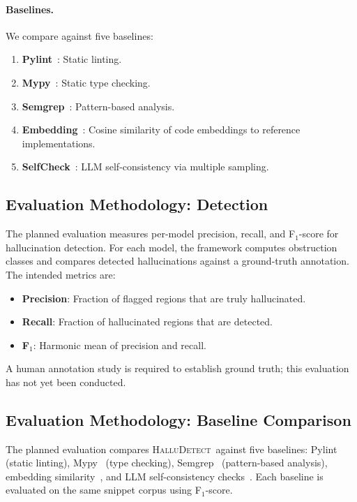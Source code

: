 \documentclass[11pt]{article}
\newcommand{\HalluDetect}{\textsc{HalluDetect}}
\begin{document}
\paragraph{Baselines.}
We compare against five baselines:
\begin{enumerate}[noitemsep]
  \item \textbf{Pylint}~\cite{Pylint}: Static linting.
  \item \textbf{Mypy}~\cite{Mypy}: Static type checking.
  \item \textbf{Semgrep}~\cite{Semgrep}: Pattern-based analysis.
  \item \textbf{Embedding}~\cite{Varshney2023}: Cosine similarity
        of code embeddings to reference implementations.
  \item \textbf{SelfCheck}~\cite{Manakul2023}: LLM self-consistency
        via multiple sampling.
\end{enumerate}

\subsection{Evaluation Methodology: Detection}

The planned evaluation measures per-model precision, recall, and
F$_1$-score for hallucination detection.  For each model, the
framework computes obstruction classes and compares detected
hallucinations against a ground-truth annotation.  The intended
metrics are:
\begin{itemize}[noitemsep]
  \item \textbf{Precision}: Fraction of flagged regions that are truly hallucinated.
  \item \textbf{Recall}: Fraction of hallucinated regions that are detected.
  \item \textbf{F$_1$}: Harmonic mean of precision and recall.
\end{itemize}
A human annotation study is required to establish ground truth;
this evaluation has not yet been conducted.


\subsection{Evaluation Methodology: Baseline Comparison}

The planned evaluation compares \HalluDetect\ against five baselines:
Pylint~\cite{Pylint} (static linting), Mypy~\cite{Mypy} (type checking),
Semgrep~\cite{Semgrep} (pattern-based analysis),
embedding similarity~\cite{Varshney2023}, and LLM self-consistency
checks~\cite{Manakul2023}.  Each baseline is evaluated on the same
snippet corpus using F$_1$-score.
\end{document}
